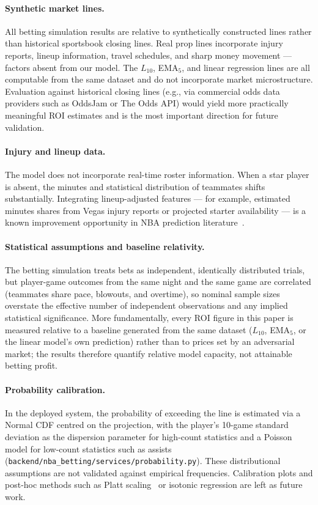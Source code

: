 \documentclass[12pt, letterpaper]{article}
\begin{document}
\paragraph{Synthetic market lines.}
All betting simulation results are relative to synthetically constructed
lines rather than historical sportsbook closing lines.
Real prop lines incorporate injury reports, lineup information, travel
schedules, and sharp money movement --- factors absent from our model.
The $L_{10}$, EMA$_5$, and linear regression lines are all computable
from the same dataset and do not incorporate market microstructure.
Evaluation against historical closing lines (e.g., via commercial odds
data providers such as OddsJam or The Odds API) would yield more
practically meaningful ROI estimates and is the most important
direction for future validation.

\paragraph{Injury and lineup data.}
The model does not incorporate real-time roster information.
When a star player is absent, the minutes and statistical distribution
of teammates shifts substantially.
Integrating lineup-adjusted features --- for example, estimated minutes
shares from Vegas injury reports or projected starter availability ---
is a known improvement opportunity in NBA prediction
literature~\citep{chen2021hybrid}.

\paragraph{Statistical assumptions and baseline relativity.}
The betting simulation treats bets as independent, identically distributed
trials, but player-game outcomes from the same night and the same game are
correlated (teammates share pace, blowouts, and overtime), so nominal
sample sizes overstate the effective number of independent observations
and any implied statistical significance.
More fundamentally, every ROI figure in this paper is measured relative to
a baseline generated from the same dataset ($L_{10}$, EMA$_5$, or the
linear model's own prediction) rather than to prices set by an adversarial
market; the results therefore quantify relative model capacity, not
attainable betting profit.

\paragraph{Probability calibration.}
In the deployed system, the probability of exceeding the line is estimated
via a Normal CDF centred on the projection, with the player's 10-game
standard deviation as the dispersion parameter for high-count statistics
and a Poisson model for low-count statistics such as assists
(\texttt{backend/nba\_betting/services/probability.py}).
These distributional assumptions are not validated against empirical
frequencies.
Calibration plots and post-hoc methods such as Platt
scaling~\citep{platt1999probabilistic} or isotonic regression are
left as future work.
\end{document}
